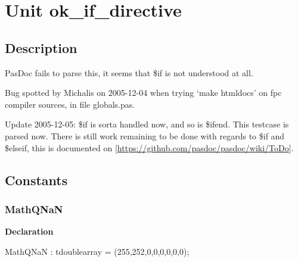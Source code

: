 \documentclass{report}
\newif\ifpdf
\begin{document}
\label{toc}\tableofcontents
\newpage
\newlength{\tmplength}
\chapter{Unit ok{\_}if{\_}directive}
\label{ok_if_directive}
\section{Description}
PasDoc fails to parse this, it seems that {\$}if is not understood at all.\hfill\vspace*{1ex}



Bug spotted by Michalis on 2005{-}12{-}04 when trying `make htmldocs' on fpc compiler sources, in file globals.pas.

Update 2005{-}12{-}05: {\$}if is sorta handled now, and so is {\$}ifend. This testcase is parsed now. There is still work remaining to be done with regards to {\$}if and {\$}elseif, this is documented on [\href{https://github.com/pasdoc/pasdoc/wiki/ToDo}{https://github.com/pasdoc/pasdoc/wiki/ToDo}].
\section{Constants}
\ifpdf
\subsection*{\large{\textbf{MathQNaN}}\normalsize\hspace{1ex}\hrulefill}
\else
\subsection*{MathQNaN}
\fi
\label{ok_if_directive-MathQNaN}
\begin{list}{}{
\setlength{\itemindent}{0cm}
\setlength{\listparindent}{0cm}
\setlength{\leftmargin}{\evensidemargin}
\addtolength{\leftmargin}{\tmplength}
\settowidth{\labelsep}{X}
\addtolength{\leftmargin}{\labelsep}
\setlength{\labelwidth}{\tmplength}
}
\item[\textbf{Declaration}\hfill]
\ifpdf
\begin{flushleft}
\fi
\begin{ttfamily}
MathQNaN : tdoublearray = (255,252,0,0,0,0,0,0);\end{ttfamily}

\ifpdf
\end{flushleft}
\fi

\end{list}
\ifpdf
\end{document}
